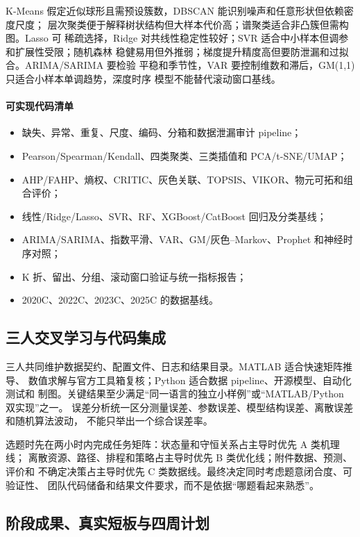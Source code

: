 \documentclass[UTF8,a4paper,12pt]{ctexart}
\begin{document}
K-Means 假定近似球形且需预设簇数，DBSCAN 能识别噪声和任意形状但依赖密度尺度；
层次聚类便于解释树状结构但大样本代价高；谱聚类适合非凸簇但需构图。Lasso 可
稀疏选择，Ridge 对共线性稳定性较好；SVR 适合中小样本但调参和扩展性受限；随机森林
稳健易用但外推弱；梯度提升精度高但要防泄漏和过拟合。ARIMA/SARIMA 要检验
平稳和季节性，VAR 要控制维数和滞后，GM(1,1) 只适合小样本单调趋势，深度时序
模型不能替代滚动窗口基线。

\paragraph{可实现代码清单}
\begin{itemize}
  \item 缺失、异常、重复、尺度、编码、分箱和数据泄漏审计 pipeline；
  \item Pearson/Spearman/Kendall、四类聚类、三类插值和 PCA/t-SNE/UMAP；
  \item AHP/FAHP、熵权、CRITIC、灰色关联、TOPSIS、VIKOR、物元可拓和组合评价；
  \item 线性/Ridge/Lasso、SVR、RF、XGBoost/CatBoost 回归及分类基线；
  \item ARIMA/SARIMA、指数平滑、VAR、GM/灰色--Markov、Prophet 和神经时序对照；
  \item K 折、留出、分组、滚动窗口验证与统一指标报告；
  \item 2020C、2022C、2023C、2025C 的数据基线。
\end{itemize}

\subsection{三人交叉学习与代码集成}

三人共同维护数据契约、配置文件、日志和结果目录。MATLAB 适合快速矩阵推导、
数值求解与官方工具箱复核；Python 适合数据 pipeline、开源模型、自动化测试和
制图。关键结果至少满足“同一语言的独立小样例”或“MATLAB/Python 双实现”之一。
误差分析统一区分测量误差、参数误差、模型结构误差、离散误差和随机算法波动，
不能只举出一个综合误差率。

选题时先在两小时内完成任务矩阵：状态量和守恒关系占主导时优先 A 类机理线；
离散资源、路径、排程和策略占主导时优先 B 类优化线；附件数据、预测、评价和
不确定决策占主导时优先 C 类数据线。最终决定同时考虑题意闭合度、可验证性、
团队代码储备和结果文件要求，而不是依据“哪题看起来熟悉”。

\subsection{阶段成果、真实短板与四周计划}
\end{document}
